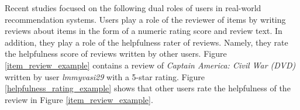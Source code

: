 \documentclass[master,english,final]{kaist-ucs}
\begin{document}
Recent studies \cite{RQMF,DualRole} focused on the following dual roles of users in real-world recommendation systems.
Users play a role of the reviewer of items by writing reviews about items in the form of a numeric rating score and review text.
In addition, they play a role of the helpfulness rater of reviews.
Namely, they rate the helpfulness score of reviews written by other users.
Figure \ref{item_review_example} contains a review of \textit{Captain America: Civil War (DVD)} written by user \textit{lmmyvasi29} with a 5-star rating.
Figure \ref{helpfulness_rating_example} shows that other users rate the helpfulness of the review in Figure \ref{item_review_example}.
\end{document}
